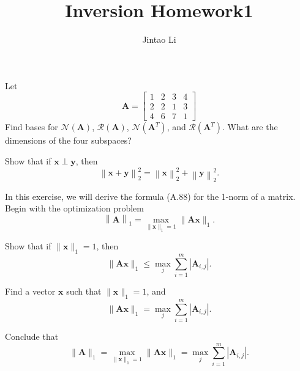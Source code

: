 \documentclass{myhw}
\title{Inversion Homework1}
\author{Jintao Li}
\begin{document}
\maketitle
\newpage

\begin{homeworkProblem}
Let 
\begin{equation}
\mathbf{A} = 
\left[
\begin{matrix}
  1 & 2 & 3 & 4 \\
  2 & 2 & 1 & 3 \\
  4 & 6 & 7 & 1
\end{matrix}
\right]
\end{equation}
Find bases for $\mathcal{N}(\mathbf{A})$, $\mathcal{R}(\mathbf{A})$, $\mathcal{N}(\mathbf{A}^T)$, 
and $\mathcal{R}(\mathbf{A}^T)$. What are the dimensions of the four subspaces?

\end{homeworkProblem}

\begin{homeworkProblem}
Show that if $\mathbf{x} \perp \mathbf{y}$, then 
\begin{equation}
\left\| \mathbf{x} + \mathbf{y} \right\|^2_2 = 
\left\| \mathbf{x} \right\|^2_2 +
\left\| \mathbf{y} \right\|^2_2 .
\end{equation}
\end{homeworkProblem}

\begin{homeworkProblem}
In this exercise, we will derive the formula (A.88) for the 1-norm of a matrix.
Begin with the optimization problem 
\begin{equation}
\left\| \mathbf{A} \right\|_1 = 
\max_{\| \mathbf{x} \|_1 = 1} \| \mathbf{Ax}\|_1 .
\end{equation}

\begin{homeworkSection}
Show that if $\|\mathbf{x}\|_1 = 1$, then
\begin{equation}
\|\mathbf{Ax}\|_1 \leq 
\max_{j} \sum\limits_{i=1}^m \left| \mathbf{A}_{i, j} \right| .
\end{equation}
\end{homeworkSection}

\begin{homeworkSection}
Find a vector $\mathbf{x}$ such that $\|\mathbf{x}\|_1 = 1$, and 
\begin{equation}
\|\mathbf{Ax}\|_1 = \max_{j} \sum\limits_{i=1}^m \left| \mathbf{A}_{i, j} \right| .
\end{equation}
\end{homeworkSection}

\begin{homeworkSection}
Conclude that 
\begin{equation}
\|\mathbf{A}\|_1 = \max_{\|\mathbf{x}\|_1 = 1} \|\mathbf{Ax}\|_1 = 
\max_{j} \sum\limits_{i=1}^m \left| \mathbf{A}_{i, j} \right| .
\end{equation}
\end{homeworkSection}
\end{homeworkProblem}
\end{document}
